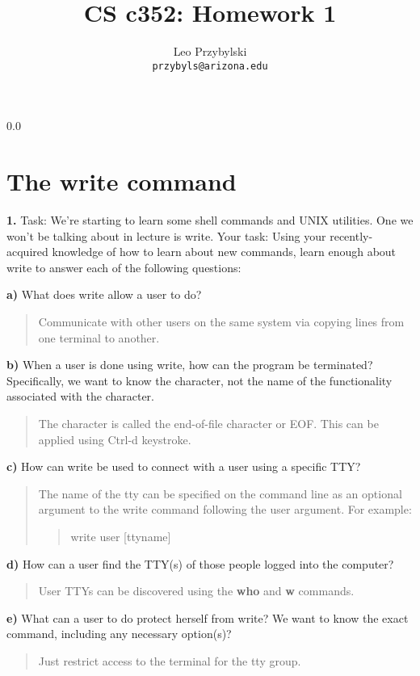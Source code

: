 \documentclass[11pt,notitlepage]{article}
\title{CS c352: Homework 1}
\author{Leo Przybylski\\
\texttt{przybyls@arizona.edu}}
\newcommand{\question}[2]{\textbf{#1.} #2}
\newcommand{\subquestion}[2]{\par\hspace{0.5cm} \textbf{#1)} #2}
\begin{document}
  \maketitle
  {\setlength{\baselineskip}%
           {0.0\baselineskip}
  \section*{The write command}
  \hrulefill \par}
\question{1}{Task: We’re starting to learn some shell commands and UNIX utilities. One we won’t be talking
about in lecture is write. Your task: Using your recently-acquired knowledge of how to learn about
new commands, learn enough about write to answer each of the following
questions:}

\subquestion{a}{What does write allow a user to do?} 
\begin{quote}Communicate with
other users on the same system via copying lines from one terminal to
another.
\end{quote}

\subquestion{b}{When a user is done using write, how can the program be terminated? Speciﬁcally, we want
to know the character, not the name of the functionality associated
with the character.}
\begin{quote}
The character is called the end-of-file character or EOF. This can be
applied using Ctrl-d keystroke.
\end{quote}

\subquestion{c}{How can write be used to connect with a user using a
  speciﬁc TTY?}
\begin{quote}
The name of the tty can be specified on the command line as an
optional argument to the write command following the user
argument. For example:
\begin{quote}
  write user [ttyname]
\end{quote}
\end{quote}

\subquestion{d}{How can a user ﬁnd the TTY(s) of those people logged
  into the computer?}
\begin{quote}
User TTYs can be discovered using the \textbf{who} and \textbf{w} commands.
\end{quote}

\subquestion{e}{What can a user to do protect herself from write? We want to know the exact command,
including any necessary option(s)?}

\begin{quote}
Just restrict access to the terminal for the tty group.
\end{quote}
\end{document}
